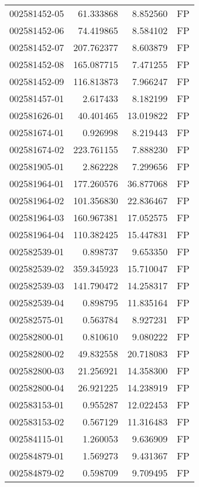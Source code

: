 \begin{tabular}{lrrl}
002581452-05 &   61.333868 &       8.852560 &   FP \\
002581452-06 &   74.419865 &       8.584102 &   FP \\
002581452-07 &  207.762377 &       8.603879 &   FP \\
002581452-08 &  165.087715 &       7.471255 &   FP \\
002581452-09 &  116.813873 &       7.966247 &   FP \\
002581457-01 &    2.617433 &       8.182199 &   FP \\
002581626-01 &   40.401465 &      13.019822 &   FP \\
002581674-01 &    0.926998 &       8.219443 &   FP \\
002581674-02 &  223.761155 &       7.888230 &   FP \\
002581905-01 &    2.862228 &       7.299656 &   FP \\
002581964-01 &  177.260576 &      36.877068 &   FP \\
002581964-02 &  101.356830 &      22.836467 &   FP \\
002581964-03 &  160.967381 &      17.052575 &   FP \\
002581964-04 &  110.382425 &      15.447831 &   FP \\
002582539-01 &    0.898737 &       9.653350 &   FP \\
002582539-02 &  359.345923 &      15.710047 &   FP \\
002582539-03 &  141.790472 &      14.258317 &   FP \\
002582539-04 &    0.898795 &      11.835164 &   FP \\
002582575-01 &    0.563784 &       8.927231 &   FP \\
002582800-01 &    0.810610 &       9.080222 &   FP \\
002582800-02 &   49.832558 &      20.718083 &   FP \\
002582800-03 &   21.256921 &      14.358300 &   FP \\
002582800-04 &   26.921225 &      14.238919 &   FP \\
002583153-01 &    0.955287 &      12.022453 &   FP \\
002583153-02 &    0.567129 &      11.316483 &   FP \\
002584115-01 &    1.260053 &       9.636909 &   FP \\
002584879-01 &    1.569273 &       9.431367 &   FP \\
002584879-02 &    0.598709 &       9.709495 &   FP \\

\end{tabular}
